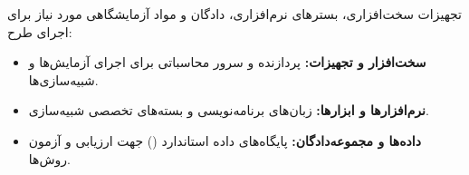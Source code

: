 
تجهیزات سخت‌افزاری، بسترهای نرم‌افزاری، دادگان و مواد آزمایشگاهی مورد نیاز برای اجرای طرح:

\begin{itemize}
    \item \textbf{سخت‌افزار و تجهیزات:} پردازنده و سرور محاسباتی برای اجرای آزمایش‌ها و شبیه‌سازی‌ها.
    \item \textbf{نرم‌افزارها و ابزارها:} زبان‌های برنامه‌نویسی و بسته‌های تخصصی شبیه‌سازی.
    \item \textbf{داده‌ها و مجموعه‌دادگان:} پایگاه‌های داده استاندارد () جهت ارزیابی و آزمون روش‌ها.
\end{itemize}
